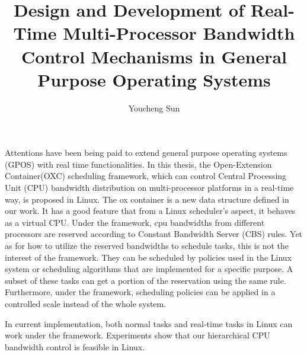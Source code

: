 \documentclass[a4paper, 12pt, openright, oneside, final]{book}%
\title{Design and Development of Real-Time Multi-Processor Bandwidth
  Control Mechanisms in General Purpose Operating Systems}
\author{Youcheng Sun}
\newcommand{\fncyblank}{\fancyhf{}}
\newenvironment{abstract}%
{\cleardoublepage\fncyblank\null\vfill\begin{center}%
\bfseries\abstractname\end{center}}%
{\vfill\null}
\begin{document}
\frontmatter




\begin{abstract}


  Attentions have been being paid to extend general purpose operating
  systems (GPOS) with real time functionalities. In this thesis, the
  Open-Extension Container(OXC) scheduling framework, which can control 
  Central Processing Unit (CPU) bandwidth distribution on multi-processor 
  platforms in a real-time way, is proposed in Linux. The ox container 
  is a new data structure defined in our work. It has a good feature 
  that from a Linux scheduler's aspect, it behaves as a virtual CPU.  
  Under the framework, cpu bandwidths from different processors are 
  reserved according to Constant Bandwidth Server (CBS) rules.  Yet 
  as for how to utilize the reserved bandwidths to schedule tasks, 
  this is not the interest of the framework. They can be scheduled by 
  policies used in the Linux system or scheduling algorithms that are 
  implemented for a specific purpose. A subset of these tasks can get 
  a portion of the reservation using the same rule.  Furthermore, under 
  the framework, scheduling policies can be applied in a controlled scale 
  instead of the whole system.

  In current implementation, both normal tasks and real-time tasks in
  Linux can work under the framework. Experiments show that our 
  hierarchical CPU bandwidth control is feasible in Linux.
\end{abstract}

\tableofcontents
\listoffigures

\mainmatter





\backmatter



\end{document}
